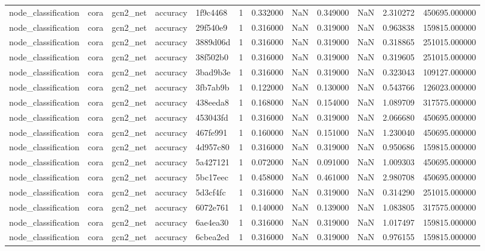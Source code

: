 \begin{tabular}{lllllrrrrrrr}
node_classification & cora & gcn2_net & accuracy & 1f9c4468 & 1 & 0.332000 & NaN & 0.349000 & NaN & 2.310272 & 450695.000000 \\
node_classification & cora & gcn2_net & accuracy & 29f540e9 & 1 & 0.316000 & NaN & 0.319000 & NaN & 0.963838 & 159815.000000 \\
node_classification & cora & gcn2_net & accuracy & 3889d06d & 1 & 0.316000 & NaN & 0.319000 & NaN & 0.318865 & 251015.000000 \\
node_classification & cora & gcn2_net & accuracy & 38f502b0 & 1 & 0.316000 & NaN & 0.319000 & NaN & 0.319605 & 251015.000000 \\
node_classification & cora & gcn2_net & accuracy & 3bad9b3e & 1 & 0.316000 & NaN & 0.319000 & NaN & 0.323043 & 109127.000000 \\
node_classification & cora & gcn2_net & accuracy & 3fb7ab9b & 1 & 0.122000 & NaN & 0.130000 & NaN & 0.543766 & 126023.000000 \\
node_classification & cora & gcn2_net & accuracy & 438eeda8 & 1 & 0.168000 & NaN & 0.154000 & NaN & 1.089709 & 317575.000000 \\
node_classification & cora & gcn2_net & accuracy & 453043fd & 1 & 0.316000 & NaN & 0.319000 & NaN & 2.066680 & 450695.000000 \\
node_classification & cora & gcn2_net & accuracy & 467fe991 & 1 & 0.160000 & NaN & 0.151000 & NaN & 1.230040 & 450695.000000 \\
node_classification & cora & gcn2_net & accuracy & 4d957c80 & 1 & 0.316000 & NaN & 0.319000 & NaN & 0.950686 & 159815.000000 \\
node_classification & cora & gcn2_net & accuracy & 5a427121 & 1 & 0.072000 & NaN & 0.091000 & NaN & 1.009303 & 450695.000000 \\
node_classification & cora & gcn2_net & accuracy & 5bc17eec & 1 & 0.458000 & NaN & 0.461000 & NaN & 2.980708 & 450695.000000 \\
node_classification & cora & gcn2_net & accuracy & 5d3cf4fc & 1 & 0.316000 & NaN & 0.319000 & NaN & 0.314290 & 251015.000000 \\
node_classification & cora & gcn2_net & accuracy & 6072e761 & 1 & 0.140000 & NaN & 0.139000 & NaN & 1.083805 & 317575.000000 \\
node_classification & cora & gcn2_net & accuracy & 6ae4ea30 & 1 & 0.316000 & NaN & 0.319000 & NaN & 1.017497 & 159815.000000 \\
node_classification & cora & gcn2_net & accuracy & 6cbea2ed & 1 & 0.316000 & NaN & 0.319000 & NaN & 0.976155 & 159815.000000 \\

\end{tabular}
